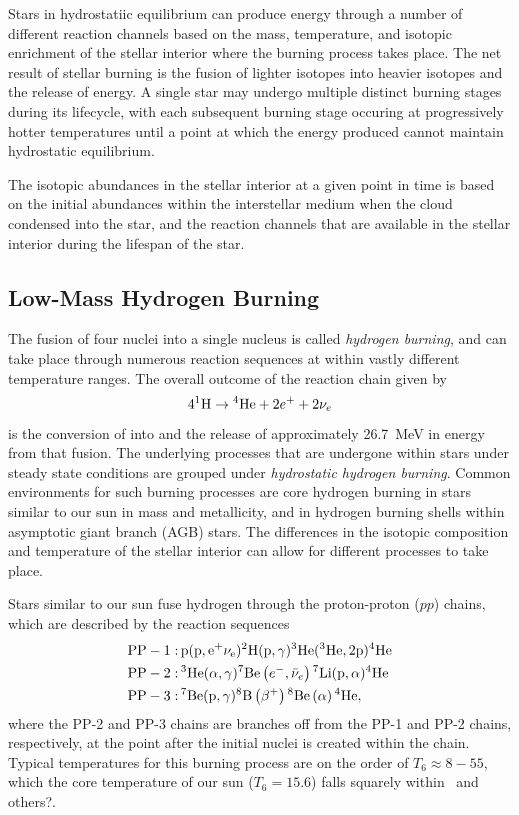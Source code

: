 Stars in hydrostatiic equilibrium can produce energy through a number of
different reaction channels based on the mass, temperature, and isotopic
enrichment of the stellar interior where the burning process takes place. The
net result of stellar burning is the fusion of lighter isotopes into heavier
isotopes and the release of energy. A single star may undergo multiple distinct
burning stages during its lifecycle, with each subsequent burning stage
occuring at progressively hotter temperatures until a point at which the energy
produced cannot maintain hydrostatic equilibrium.

The isotopic abundances in the stellar interior at a given point in time is
based on the initial abundances within the interstellar medium when the cloud
condensed into the star, and the reaction channels that are available in the
stellar interior during the lifespan of the star.

\subsection{Low-Mass Hydrogen Burning}

The fusion of four  nuclei into a single  nucleus is
called \emph{hydrogen burning}, and can take place through numerous reaction
sequences at within vastly different temperature ranges. The overall outcome
of the reaction chain given by
\[
    4{}^{1}\textrm{H} \rightarrow{} {}^{4}\textrm{He} + 2e^+ + 2\nu_e
\]
is the conversion of  into  and the release of
approximately 26.7~MeV in energy from that fusion. The underlying processes
that are undergone within stars under steady state conditions are grouped under
\emph{hydrostatic hydrogen burning}. Common environments for such burning
processes are core hydrogen burning in stars similar to our sun in mass and
metallicity, and in hydrogen burning shells within asymptotic giant branch
(AGB) stars. The differences in the isotopic composition and temperature of the
stellar interior can allow for different processes to take place.

Stars similar to our sun fuse hydrogen through the proton-proton ($pp$) chains,
which are described by the reaction sequences
\begin{align*}
    \rm{PP-1:\,}& \rm{p}(\rm{p},e^+\nu_e)
        {}^{2}\textrm{H}(\rm{p},\gamma)
        {}^{3}\textrm{He}({}^{3}\textrm{He},2\rm{p}){}^{4}\textrm{He} \\
    \rm{PP-2:\,}& {}^{3}\textrm{He}(\alpha,\gamma){}^{7}\textrm{Be}
        \left(e^-,\bar{\nu}_e\right){}^{7}\textrm{Li}(\rm{p},\alpha){}^{4}\textrm{He} \\
    \rm{PP-3:\,}& {}^{7}\textrm{Be}(\rm{p},\gamma){}^{8}\textrm{B}
        \left(\beta^+\right){}^{8}\textrm{Be}\left(\alpha\right){}^{4}\textrm{He},
\end{align*}
where the PP-2 and PP-3 chains are branches off from the PP-1 and PP-2 chains,
respectively, at the point after the initial nuclei is created within the
chain. Typical temperatures for this burning process are on the order of
$T_6 \approx 8-55$, which the core temperature of our sun ($T_6 = 15.6$) falls
squarely within~\cite{Iliadis} and others?.

